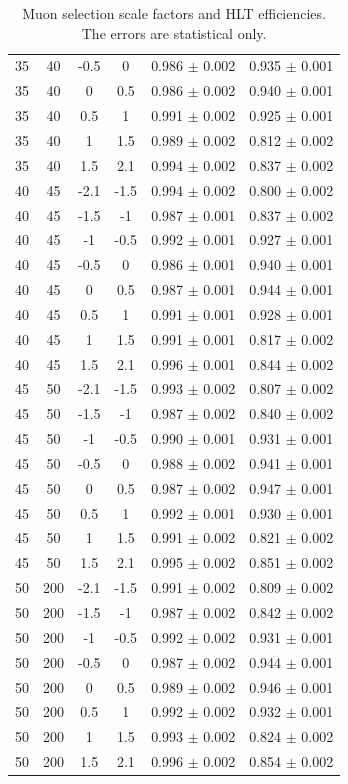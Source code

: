 \begin{table}[htb]
{\begin{tabular}{|c|c|c|c|c|c|}
  35 & 40 & -0.5 & 0 & 0.986 $\pm$ 0.002 & 0.935 $\pm$ 0.001 \\
  35 & 40 & 0 & 0.5 & 0.986 $\pm$ 0.002 & 0.940 $\pm$ 0.001 \\
  35 & 40 & 0.5 & 1 & 0.991 $\pm$ 0.002 & 0.925 $\pm$ 0.001 \\
  35 & 40 & 1 & 1.5 & 0.989 $\pm$ 0.002 & 0.812 $\pm$ 0.002 \\
  35 & 40 & 1.5 & 2.1 & 0.994 $\pm$ 0.002 & 0.837 $\pm$ 0.002 \\
  40 & 45 & -2.1 & -1.5 & 0.994 $\pm$ 0.002 & 0.800 $\pm$ 0.002 \\
  40 & 45 & -1.5 & -1 & 0.987 $\pm$ 0.001 & 0.837 $\pm$ 0.002 \\
  40 & 45 & -1 & -0.5 & 0.992 $\pm$ 0.001 & 0.927 $\pm$ 0.001 \\
  40 & 45 & -0.5 & 0 & 0.986 $\pm$ 0.001 & 0.940 $\pm$ 0.001 \\
  40 & 45 & 0 & 0.5 & 0.987 $\pm$ 0.001 & 0.944 $\pm$ 0.001 \\
  40 & 45 & 0.5 & 1 & 0.991 $\pm$ 0.001 & 0.928 $\pm$ 0.001 \\
  40 & 45 & 1 & 1.5 & 0.991 $\pm$ 0.001 & 0.817 $\pm$ 0.002 \\
  40 & 45 & 1.5 & 2.1 & 0.996 $\pm$ 0.001 & 0.844 $\pm$ 0.002 \\
  45 & 50 & -2.1 & -1.5 & 0.993 $\pm$ 0.002 & 0.807 $\pm$ 0.002 \\
  45 & 50 & -1.5 & -1 & 0.987 $\pm$ 0.002 & 0.840 $\pm$ 0.002 \\
  45 & 50 & -1 & -0.5 & 0.990 $\pm$ 0.001 & 0.931 $\pm$ 0.001 \\
  45 & 50 & -0.5 & 0 & 0.988 $\pm$ 0.002 & 0.941 $\pm$ 0.001 \\
  45 & 50 & 0 & 0.5 & 0.987 $\pm$ 0.002 & 0.947 $\pm$ 0.001 \\
  45 & 50 & 0.5 & 1 & 0.992 $\pm$ 0.001 & 0.930 $\pm$ 0.001 \\
  45 & 50 & 1 & 1.5 & 0.991 $\pm$ 0.002 & 0.821 $\pm$ 0.002 \\
  45 & 50 & 1.5 & 2.1 & 0.995 $\pm$ 0.002 & 0.851 $\pm$ 0.002 \\
  50 & 200 & -2.1 & -1.5 & 0.991 $\pm$ 0.002 & 0.809 $\pm$ 0.002 \\
  50 & 200 & -1.5 & -1 & 0.987 $\pm$ 0.002 & 0.842 $\pm$ 0.002 \\
  50 & 200 & -1 & -0.5 & 0.992 $\pm$ 0.002 & 0.931 $\pm$ 0.001 \\
  50 & 200 & -0.5 & 0 & 0.987 $\pm$ 0.002 & 0.944 $\pm$ 0.001 \\
  50 & 200 & 0 & 0.5 & 0.989 $\pm$ 0.002 & 0.946 $\pm$ 0.001 \\
  50 & 200 & 0.5 & 1 & 0.992 $\pm$ 0.002 & 0.932 $\pm$ 0.001 \\
  50 & 200 & 1 & 1.5 & 0.993 $\pm$ 0.002 & 0.824 $\pm$ 0.002 \\
  50 & 200 & 1.5 & 2.1 & 0.996 $\pm$ 0.002 & 0.854 $\pm$ 0.002 \\
  \hline
  \end{tabular}}
\caption{Muon selection scale factors and HLT efficiencies. The errors are statistical only.} 
\label{tab:muonEff} 
\end{table}

